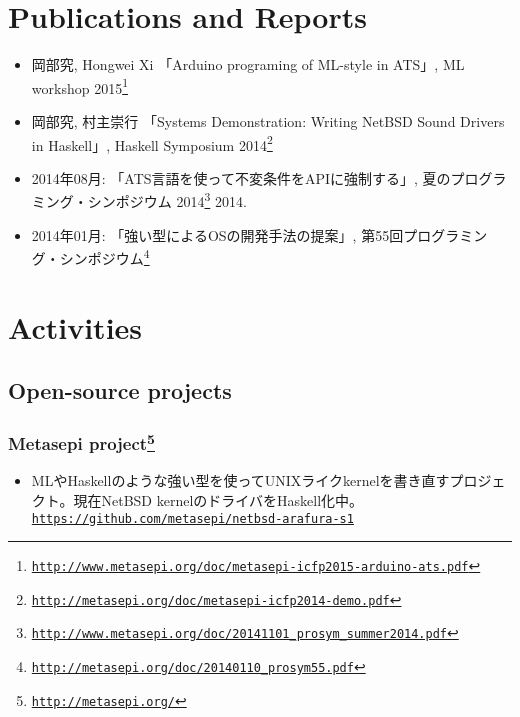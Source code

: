 \documentclass[letterpaper]{article}
\begin{document}
\section*{Publications and Reports}

\begin{itemize}
  \item 岡部究, Hongwei Xi 「Arduino programing of ML-style in ATS」, ML workshop 2015\footnote{\href{http://www.metasepi.org/doc/metasepi-icfp2015-arduino-ats.pdf}{\tt http://www.metasepi.org/doc/metasepi-icfp2015-arduino-ats.pdf}}
  \item 岡部究, 村主崇行 「Systems Demonstration: Writing NetBSD Sound Drivers in Haskell」, Haskell Symposium 2014\footnote{\href{http://metasepi.org/doc/metasepi-icfp2014-demo.pdf}{\tt http://metasepi.org/doc/metasepi-icfp2014-demo.pdf}}
  \item 2014年08月: 「ATS言語を使って不変条件をAPIに強制する」, 夏のプログラミング・シンポジウム 2014\footnote{\href{http://www.metasepi.org/doc/20141101\_prosym\_summer2014.pdf}{\tt http://www.metasepi.org/doc/20141101\_prosym\_summer2014.pdf}}  2014.
  \item 2014年01月: 「強い型によるOSの開発手法の提案」, 第55回プログラミング・シンポジウム\footnote{\href{http://metasepi.org/doc/20140110\_prosym55.pdf}{\tt http://metasepi.org/doc/20140110\_prosym55.pdf}}
\end{itemize}

\section*{Activities}

\subsection*{Open-source projects}

\subsubsection*{Metasepi project\footnote{\href{http://metasepi.org/}{\tt http://metasepi.org/}}}
\begin{itemize}
\item MLやHaskellのような強い型を使ってUNIXライクkernelを書き直すプロジェクト。現在NetBSD kernelのドライバをHaskell化中。 \href{https://github.com/metasepi/netbsd-arafura-s1}{\tt https://github.com/metasepi/netbsd-arafura-s1}
\end{itemize}
\end{document}
